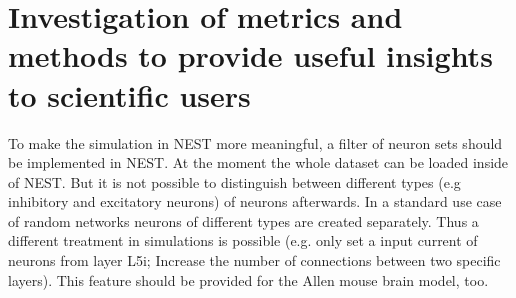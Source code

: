 \documentclass[a4paper]{article}
\begin{document}
\section{Investigation of metrics and  methods to provide useful insights to scientific users}
To make the simulation in NEST more meaningful, a filter of neuron sets should be implemented in NEST.
At the moment the whole dataset can be loaded inside of NEST.
But it is not possible to distinguish between different types (e.g inhibitory and excitatory neurons) of neurons afterwards.
In a standard use case of random networks neurons of different types are created separately. 
Thus a different treatment in simulations is possible (e.g. only set a input current of neurons from layer L5i; Increase the number of connections between two specific layers). This feature should be provided for the Allen mouse brain model, too.
\end{document}
